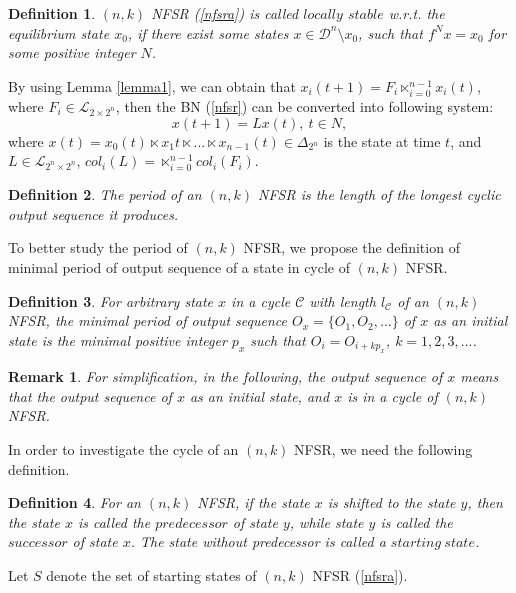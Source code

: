 \documentclass[conference]{IEEEtran}
\newtheorem{definition}{Definition}
\newtheorem{remark}{Remark}
\begin{document}
\begin{definition}
$(n,k)$ NFSR (\ref{nfsra}) is called $locally$ $stable$ w.r.t. the equilibrium state $x_0$, if there exist some states $x\in  \mathcal{D}^n\setminus x_0$, such that $f^Nx=x_0$ for some positive integer $N$.
\end{definition}


By using Lemma \ref{lemma1}, we can obtain that $x_i(t+1)=F_i\ltimes^{n-1}_{i=0} x_i(t)$, where $F_i\in \mathcal{L}_{2\times 2^n}$, then the BN (\ref{nfsr}) can be converted into following system:
\begin{equation}\label{nfsr1}
x(t+1)=Lx(t),~t\in N,
\end{equation}
where $x(t)=x_0(t)\ltimes x_1{t}\ltimes ...\ltimes x_{n-1}(t) \in \Delta_{2^n}$ is the state at time $t$, and $L\in \mathcal{L}_{2^n\times2^n}$, $col_i(L)=\ltimes^{n-1}_{i=0}col_i(F_i)$.

\begin{definition}\cite{Dubrova2008On}
The period of an $(n,k)$ NFSR is the length of the longest cyclic output sequence it produces.
\end{definition}

To better study the period of $(n,k)$ NFSR, we propose the definition of minimal period of output sequence of a state in cycle of $(n,k)$ NFSR.
\begin{definition}
For arbitrary state $x$ in a cycle $\mathcal{C}$ with length $l_{\mathcal{C}}$ of an $(n,k)$ NFSR, the minimal period of output sequence $O_x=\{O_1,O_2,...\}$ of $x$ as an initial state is the minimal positive integer $p_x$ such that $O_i=O_{i+kp_x}$, $k=1,2,3,...$.
\end{definition}

\begin{remark}
For simplification, in the following, the output sequence of $x$ means that the output sequence of $x$ as an initial state, and $x$ is in a cycle of $(n,k)$ NFSR.
\end{remark}
In order to investigate the cycle of an $(n,k)$ NFSR, we need the following definition.
\begin{definition}
For an $(n,k)$ NFSR, if the state $x$ is shifted to the state $y$, then the state $x$ is called the $predecessor$ of state $y$, while state $y$ is called the $successor$ of state $x$. The state without predecessor is called a $starting~ state$.
\end{definition}
Let $S$ denote the set of starting states of $(n,k)$ NFSR (\ref{nfsra}).
\end{document}
